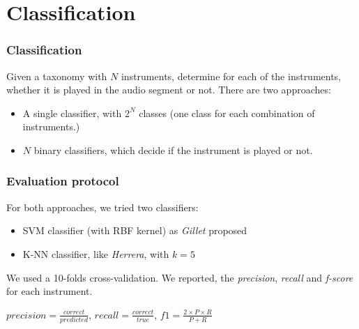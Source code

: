 \documentclass{beamer}
\begin{document}
    \section{Classification}
    \begin{frame}
        \frametitle{Classification}
        Given a taxonomy with $N$ instruments, determine for each of the instruments, whether it is played in the audio segment or not.
        There are two approaches:
        \begin{itemize}
            \item A single classifier, with $2^N$ classes (one class for each combination of instruments.)
            \item $N$ binary classifiers, which decide if the instrument is played or not.
        \end{itemize}
    \end{frame}
    \begin{frame}
        \frametitle{Evaluation protocol}
        For both approaches, we tried two classifiers:
        \begin{itemize}
            \item SVM classifier (with RBF kernel) as \emph{Gillet} proposed
            \item K-NN classifier, like \emph{Herrera}, with $k=5$
        \end{itemize}
      
        We used a 10-folds cross-validation.
        We reported, the \emph{precision}, \emph{recall} and \emph{f-score} for each instrument.
        \vspace{0.5cm}
        
        $precision=\frac{correct}{predicted}$,
        $recall=\frac{correct}{true}$,
        $f1=\frac{2\times P\times R}{P+R}$
    \end{frame}
\end{document}
